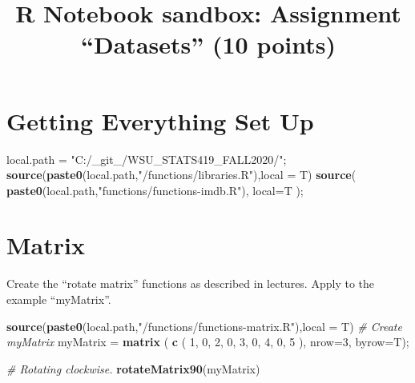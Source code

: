 \documentclass[
]{article}
\title{R Notebook sandbox: Assignment ``Datasets'' (10 points)}
\author{}
\date{\vspace{-2.5em}}
\newenvironment{Shaded}{\begin{snugshade}}{\end{snugshade}}
\newcommand{\CommentTok}[1]{\textcolor[rgb]{0.56,0.35,0.01}{\textit{#1}}}
\newcommand{\DataTypeTok}[1]{\textcolor[rgb]{0.13,0.29,0.53}{#1}}
\newcommand{\DecValTok}[1]{\textcolor[rgb]{0.00,0.00,0.81}{#1}}
\newcommand{\KeywordTok}[1]{\textcolor[rgb]{0.13,0.29,0.53}{\textbf{#1}}}
\newcommand{\NormalTok}[1]{#1}
\newcommand{\StringTok}[1]{\textcolor[rgb]{0.31,0.60,0.02}{#1}}
\begin{document}
\maketitle

\hypertarget{getting-everything-set-up}{%
\section{Getting Everything Set Up}\label{getting-everything-set-up}}

\begin{Shaded}
\begin{Highlighting}[]
\NormalTok{local.path =}\StringTok{ "C:/_git_/WSU_STATS419_FALL2020/"}\NormalTok{;}
\KeywordTok{source}\NormalTok{(}\KeywordTok{paste0}\NormalTok{(local.path,}\StringTok{"/functions/libraries.R"}\NormalTok{),}\DataTypeTok{local =}\NormalTok{ T)}
\KeywordTok{source}\NormalTok{( }\KeywordTok{paste0}\NormalTok{(local.path,}\StringTok{"functions/functions-imdb.R"}\NormalTok{), }\DataTypeTok{local=}\NormalTok{T );}
\end{Highlighting}
\end{Shaded}

\hypertarget{matrix}{%
\section{Matrix}\label{matrix}}

Create the ``rotate matrix'' functions as described in lectures. Apply
to the example ``myMatrix''.

\begin{Shaded}
\begin{Highlighting}[]
\KeywordTok{source}\NormalTok{(}\KeywordTok{paste0}\NormalTok{(local.path,}\StringTok{"/functions/functions-matrix.R"}\NormalTok{),}\DataTypeTok{local =}\NormalTok{ T)}
\CommentTok{# Create myMatrix}
\NormalTok{myMatrix =}\StringTok{ }\KeywordTok{matrix}\NormalTok{ ( }\KeywordTok{c}\NormalTok{ (}
\DecValTok{1}\NormalTok{, }\DecValTok{0}\NormalTok{, }\DecValTok{2}\NormalTok{,}
\DecValTok{0}\NormalTok{, }\DecValTok{3}\NormalTok{, }\DecValTok{0}\NormalTok{,}
\DecValTok{4}\NormalTok{, }\DecValTok{0}\NormalTok{, }\DecValTok{5}
\NormalTok{), }\DataTypeTok{nrow=}\DecValTok{3}\NormalTok{,}
\DataTypeTok{byrow=}\NormalTok{T);}

\CommentTok{# Rotating clockwise.}
\KeywordTok{rotateMatrix90}\NormalTok{(myMatrix)}
\end{Highlighting}
\end{Shaded}
\end{document}
